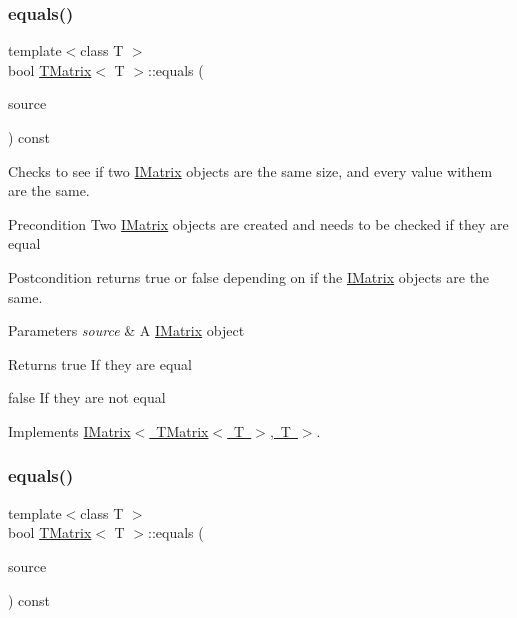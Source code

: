 \subsubsection{\texorpdfstring{equals()}{equals()}\hspace{0.1cm}{\footnotesize\ttfamily [2/6]}}
{\footnotesize\ttfamily template$<$class T $>$ \\
bool \mbox{\hyperlink{class_t_matrix}{T\+Matrix}}$<$ T $>$\+::equals (\begin{DoxyParamCaption}\item[{const \mbox{\hyperlink{class_i_matrix}{I\+Matrix}}$<$ \mbox{\hyperlink{class_t_matrix}{T\+Matrix}}$<$ T $>$, T $>$ \&}]{source }\end{DoxyParamCaption}) const\hspace{0.3cm}{\ttfamily [virtual]}}



Checks to see if two \mbox{\hyperlink{class_i_matrix}{I\+Matrix}} objects are the same size, and every value withem are the same. 

\begin{DoxyPrecond}{Precondition}
Two \mbox{\hyperlink{class_i_matrix}{I\+Matrix}} objects are created and needs to be checked if they are equal 
\end{DoxyPrecond}
\begin{DoxyPostcond}{Postcondition}
returns true or false depending on if the \mbox{\hyperlink{class_i_matrix}{I\+Matrix}} objects are the same.
\end{DoxyPostcond}

\begin{DoxyParams}{Parameters}
{\em source} & A \mbox{\hyperlink{class_i_matrix}{I\+Matrix}} object \\
\hline
\end{DoxyParams}
\begin{DoxyReturn}{Returns}
true If they are equal 

false If they are not equal 
\end{DoxyReturn}


Implements \mbox{\hyperlink{class_i_matrix_afa03122ed7ddb531656ce27690f8fb03}{I\+Matrix$<$ T\+Matrix$<$ T $>$, T $>$}}.

\mbox{\label{class_t_matrix_acfda342c2b3e272aacb9137b58a3e906}} 
\subsubsection{\texorpdfstring{equals()}{equals()}\hspace{0.1cm}{\footnotesize\ttfamily [3/6]}}
{\footnotesize\ttfamily template$<$class T $>$ \\
bool \mbox{\hyperlink{class_t_matrix}{T\+Matrix}}$<$ T $>$\+::equals (\begin{DoxyParamCaption}\item[{const \mbox{\hyperlink{class_i_matrix}{I\+Matrix}}$<$ \mbox{\hyperlink{class_l_matrix}{L\+Matrix}}$<$ T $>$, T $>$ \&}]{source }\end{DoxyParamCaption}) const}



